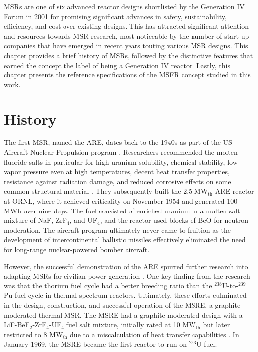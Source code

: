 \glspl{MSR} are one of six advanced reactor designs shortlisted by
the Generation IV Forum in 2001 for promising significant advances in safety,
sustainability, efficiency, and cost over existing designs. This
has attracted significant attention and resources towards
\gls{MSR} research, most noticeable by the number of start-up companies that
have emerged in recent years touting various \gls{MSR} designs. This chapter
provides a brief history of \glspl{MSR}, followed by the distinctive features
that earned the concept the label of being a Generation IV reactor. Lastly,
this chapter presents the reference specifications of the \gls{MSFR} concept
studied in this work.

\section{History}

The first \gls{MSR}, named the \gls{ARE}, dates back to the 1940s
as part of the US Aircraft Nuclear Propulsion program
\cite{rosenthal_molten-salt_1970}. Researchers recommended the molten fluoride
salts in particular for high uranium solubility, chemical stability, low vapor
pressure even at high temperatures, decent heat transfer properties,
resistance against radiation damage, and reduced corrosive effects on some
common structural material \cite{rosenthal_molten-salt_1970}. They
subsequently built the 2.5 MW$_{\text{th}}$ ARE reactor at \gls{ORNL}, where
it achieved criticality on November 1954 and generated 100 MWh over nine days.
The fuel consisted of enriched uranium in a molten salt mixture of NaF,
ZrF$_4$, and UF$_4$, and the reactor used blocks of BeO for neutron
moderation. The aircraft program
ultimately never came to fruition as the development of intercontinental
ballistic missiles effectively eliminated the need for long-range
nuclear-powered bomber aircraft.

However, the successful demonstration of the \gls{ARE} spurred further
research into adapting \glspl{MSR} for civilian power generation
\cite{rosenthal_molten-salt_1970}. One key finding from the
research was that the thorium fuel cycle had a better breeding ratio than the
$^{238}$U-to-$^{239}$Pu fuel cycle in thermal-spectrum reactors.
Ultimately, these efforts culminated in the design, construction, and
successful operation of the \gls{MSRE}, a graphite-moderated thermal
\gls{MSR}. The \gls{MSRE} had a
graphite-moderated design with a LiF-BeF$_2$-ZrF$_4$-UF$_4$ fuel salt mixture,
initially rated at 10 MW$_{\text{th}}$ but later restricted to 8
MW$_{\text{th}}$ due to a miscalculation of heat transfer capabilities
\cite{haubenreich_experience_1970}. In January 1969, the \gls{MSRE} became the
first reactor to run on $^{233}$U fuel.

